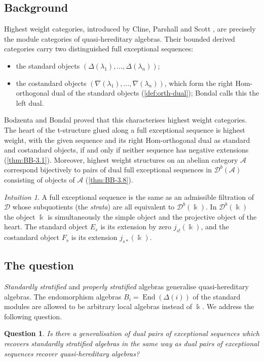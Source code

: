 \documentclass[11pt,reqno]{amsart}
\theoremstyle{plain}
\newtheorem{question}[theorem]{Question}
\theoremstyle{definition}
\theoremstyle{remark}
\newtheorem*{intuition}{Intuition}
\newcommand{\kk}{\Bbbk}
\DeclareMathOperator{\End}{End}
\newcommand{\Db}{\mathcal{D}^b}
\newcommand{\cD}{\mathcal{D}}
\newcommand{\cA}{\mathcal{A}}
\begin{document}
\subsection{Background}
Highest weight categories, introduced by Cline, Parshall and Scott \cite{CPS88}, are precisely the module categories of quasi-hereditary algebras. Their bounded derived categories carry two distinguished full exceptional sequences:
\begin{itemize}
\item the standard objects $(\Delta(\lambda_1),\dots,\Delta(\lambda_n))$;
\item the costandard objects $(\nabla(\lambda_1),\dots,\nabla(\lambda_n))$, which form the right Hom-orthogonal dual of the standard objects (\cref{def:orth-dual}); Bondal calls this the left dual.
\end{itemize}
Bodzenta and Bondal \cite{BB26} proved that this characterises highest weight categories. The heart of the t-structure glued along a full exceptional sequence is highest weight, with the given sequence and its right Hom-orthogonal dual as standard and costandard objects, if and only if neither sequence has negative extensions (\cref{thm:BB-3.1}). Moreover, highest weight structures on an abelian category $\cA$ correspond bijectively to pairs of dual full exceptional sequences in $\Db(\cA)$ consisting of objects of $\cA$ (\cref{thm:BB-3.8}).

\begin{intuition}
A full exceptional sequence is the same as an admissible filtration of $\cD$ whose subquotients (the \emph{strata}) are all equivalent to $\Db(\kk)$. In $\Db(\kk)$ the object $\kk$ is simultaneously the simple object and the projective object of the heart. The standard object $E_s$ is its extension by zero $j_{s!}(\kk)$, and the costandard object $F_s$ is its extension $j_{s*}(\kk)$.
\end{intuition}

\subsection{The question}
\emph{Standardly stratified} and \emph{properly stratified} algebras \cite{CPS96,Dla96,AHLU00} generalise quasi-hereditary algebras. The endomorphism algebras $B_i=\End(\Delta(i))$ of the standard modules are allowed to be arbitrary local algebras instead of $\kk$. We address the following question.

\begin{question}\label{q:main}
Is there a generalisation of dual pairs of exceptional sequences which recovers standardly stratified algebras in the same way as dual pairs of exceptional sequences recover quasi-hereditary algebras?
\end{question}
\end{document}
